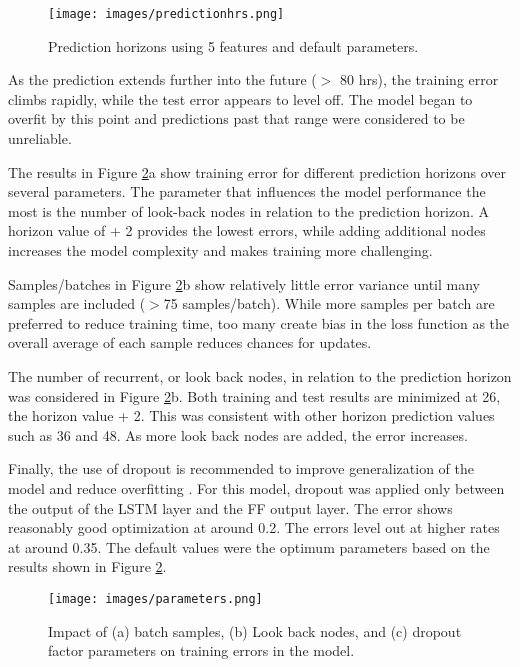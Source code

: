 %
\begin{figure}[H]
\centering
\texttt{[image: images/predictionhrs.png]}
\caption{Prediction horizons using 5 features and default parameters.}
\label{fig:predictionhrs}
\end{figure}
%
As the prediction extends further into the future ($>$ 80 hrs), the training error climbs rapidly, while the test error appears to level off. The model began to overfit by this point and predictions past that range were considered to be unreliable.

The results in  Figure \ref{fig:parameters}a show training error for different prediction horizons over several parameters. The parameter that influences the model performance the most is the number of look-back nodes in relation to the prediction horizon. A horizon value of + 2 provides the lowest errors, while adding additional nodes increases the model complexity and makes training more challenging. 

Samples/batches in Figure \ref{fig:parameters}b show relatively little error variance until many samples are included ($>$75 samples/batch). While more samples per batch are preferred to reduce training time, too many create bias in the loss function as the overall average of each sample reduces chances for updates.

The number of recurrent, or look back nodes, in relation to the prediction horizon was considered in  Figure \ref{fig:parameters}b. Both training and test results are minimized at 26, the horizon value + 2. This was consistent with other horizon prediction values such as 36 and 48. As more look back nodes are added, the error increases.

Finally, the use of dropout is recommended to improve generalization of the model and reduce overfitting \citep{Gal2016}. For this model, dropout was applied only between the output of the LSTM layer and the FF output layer. The error shows reasonably good optimization at around 0.2. The errors level out at higher rates at around 0.35. The default values were the optimum parameters based on the results shown in Figure \ref{fig:parameters}.
%
\begin{figure}[H]
\centering
\texttt{[image: images/parameters.png]}
\caption[Impact of model parameters on training error]{Impact of (a) batch samples, (b) Look back nodes, and (c) dropout factor parameters on training errors in the model.}
\label{fig:parameters}
\end{figure}
%

